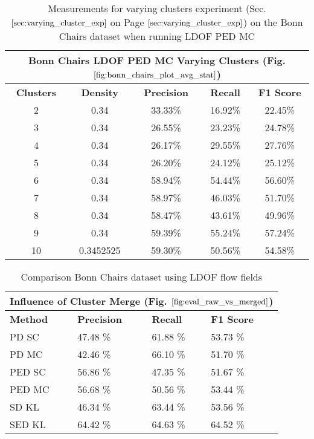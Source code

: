 \begin{table}[H]
\centering
\begin{tabular}{|c|c|c|c|c|}
\hline
\multicolumn{5}{|c|}{Bonn Chairs LDOF PED MC Varying Clusters (Fig. $\ref{fig:bonn_chairs_plot_avg_stat}$)}                        \\ \hline
\textbf{Clusters} & \textbf{Density} & \textbf{Precision} & \textbf{Recall} & \textbf{F1 Score} \\ \hline
2 & 0.34 & 33.33\%   & 16.92\%     & 22.45\%  \\ \hline
3 & 0.34 & 26.55\%   & 23.23\%     & 24.78\%  \\ \hline
4 & 0.34 & 26.17\%   & 29.55\%     & 27.76\%  \\ \hline
5 & 0.34 & 26.20\%   & 24.12\%     & 25.12\%  \\ \hline
6 & 0.34 & 58.94\%   & 54.44\%     & 56.60\%  \\ \hline
7 & 0.34 & 58.97\%   & 46.03\%     & 51.70\%  \\ \hline
8 & 0.34 & 58.47\%   & 43.61\%     & 49.96\%  \\ \hline
9 & 0.34 & 59.39\%   & 55.24\%     & 57.24\%  \\ \hline              
10 & 0.3452525  & 59.30\%   & 50.56\%     & 54.58\%  \\ \hline
\end{tabular}
\caption[Bonn Chairs PED MC Varying Clusters]{Measurements for varying clusters experiment (Sec. $\ref{sec:varying_cluster_exp}$ on Page $\pageref{sec:varying_cluster_exp}$) on the Bonn Chairs dataset when running LDOF PED MC}
\label{tab:bonn_chairs_ldof_sed_c_6_9_10_eval_ped_mc}
\end{table}

\begin{table}[H]
\centering
\begin{tabular}{|l|l|l|l|}
\hline
\multicolumn{4}{|c|}{Influence of Cluster Merge (Fig. $\ref{fig:eval_raw_vs_merged}$)}                        \\ \hline
\textbf{Method} & \textbf{Precision} & \textbf{Recall} & \textbf{F1 Score} \\ \hline
PD SC & 47.48 \%   & 61.88 \%     & 53.73 \%  \\ \hline
PD MC & 42.46 \%   & 66.10 \%     & 51.70 \%    \\ \hline
PED SC & 56.86 \%   & 47.35 \%     & 51.67 \%    \\ \hline
PED MC & 56.68 \%   & 50.56 \%     & 53.44 \%     \\ \hline              
SD KL & 46.34 \%   & 63.44 \%     & 53.56 \%     \\ \hline
SED KL & 64.42 \%   & 64.63 \%     & 64.52 \%    \\ \hline
\end{tabular}
\caption[Statistics Bonn Chairs Frame 30]{Comparison Bonn Chairs dataset using LDOF flow fields}
\label{tab:eval_stat_raw_merged}
\end{table}

